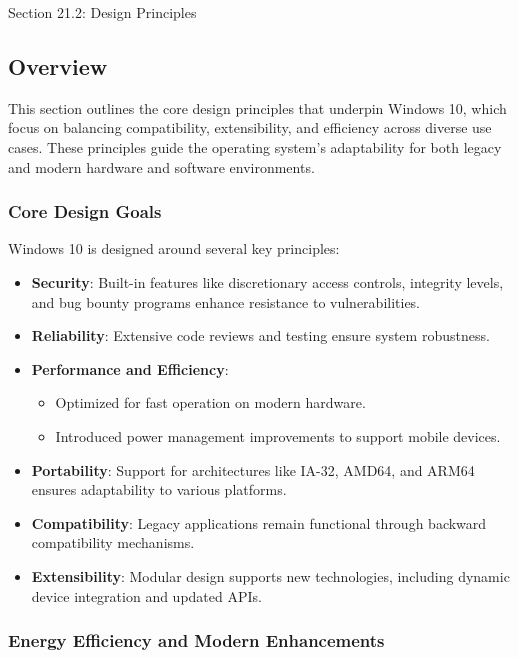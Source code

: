 \begin{notes}{Section 21.2: Design Principles}
    \subsection*{Overview}

    This section outlines the core design principles that underpin Windows 10, which focus on balancing compatibility, extensibility, and efficiency across diverse use cases. These principles guide 
    the operating system's adaptability for both legacy and modern hardware and software environments.
    
    \subsubsection*{Core Design Goals}
    
    Windows 10 is designed around several key principles:
    \begin{itemize}
        \item \textbf{Security}: Built-in features like discretionary access controls, integrity levels, and bug bounty programs enhance resistance to vulnerabilities.
        \item \textbf{Reliability}: Extensive code reviews and testing ensure system robustness.
        \item \textbf{Performance and Efficiency}:
        \begin{itemize}
            \item Optimized for fast operation on modern hardware.
            \item Introduced power management improvements to support mobile devices.
        \end{itemize}
        \item \textbf{Portability}: Support for architectures like IA-32, AMD64, and ARM64 ensures adaptability to various platforms.
        \item \textbf{Compatibility}: Legacy applications remain functional through backward compatibility mechanisms.
        \item \textbf{Extensibility}: Modular design supports new technologies, including dynamic device integration and updated APIs.
    \end{itemize}
    
    \subsubsection*{Energy Efficiency and Modern Enhancements}
    

\end{notes}
